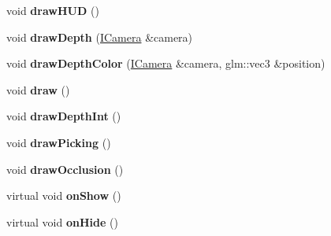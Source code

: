 \begin{DoxyCompactItemize}
void {\bfseries draw\+H\+UD} ()
\item 
\mbox{\label{classflw_1_1flf_1_1Scene_ac2ba9bb56505a843ad14fac010784592}} 
void {\bfseries draw\+Depth} (\hyperlink{classflw_1_1flf_1_1ICamera}{I\+Camera} \&camera)
\item 
\mbox{\label{classflw_1_1flf_1_1Scene_ae16cb4f3294ed4164db2f7ed89ab3796}} 
void {\bfseries draw\+Depth\+Color} (\hyperlink{classflw_1_1flf_1_1ICamera}{I\+Camera} \&camera, glm\+::vec3 \&position)
\item 
\mbox{\label{classflw_1_1flf_1_1Scene_a0fcbe99eab93306a09ecd875a485f058}} 
void {\bfseries draw} ()
\item 
\mbox{\label{classflw_1_1flf_1_1Scene_a4b60d0d59a34032b377c3fb588928291}} 
void {\bfseries draw\+Depth\+Int} ()
\item 
\mbox{\label{classflw_1_1flf_1_1Scene_afe9a1c362ecb88659c29c21508152e11}} 
void {\bfseries draw\+Picking} ()
\item 
\mbox{\label{classflw_1_1flf_1_1Scene_a2b43d217669e21a2048aab75761cbfe6}} 
void {\bfseries draw\+Occlusion} ()
\item 
\mbox{\label{classflw_1_1flf_1_1Scene_a85ec0fc6f17e504134c8be933fa6e230}} 
virtual void {\bfseries on\+Show} ()
\item 
\mbox{\label{classflw_1_1flf_1_1Scene_a8552db5ba8145e7b848f95bd4dd5bf2a}} 
virtual void {\bfseries on\+Hide} ()
\end{DoxyCompactItemize}
